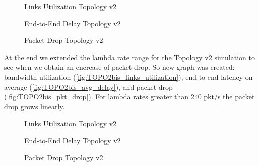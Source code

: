 \documentclass{article}
\begin{document}
\begin{figure}[H]
    \centering
    
    \caption{Links Utilization Topology v2}
    \label{fig:TOPO2_links_utilization}
\end{figure}
\begin{figure}[H]
    \centering
    
    \caption{End-to-End Delay Topology v2}
    \label{fig:TOPO2_avg_delay}
\end{figure}
\begin{figure}[H]
    \centering
    
    \caption{Packet Drop Topology v2}
    \label{fig:TOPO2_pkt_drop}
\end{figure}

\noindent At the end we extended the lambda rate range for the Topology v2 simulation to see when we obtain an encrease of packet drop. So new graph was created: bandwidth utilization (\autoref{fig:TOPO2bis_links_utilization}), end-to-end latency on average (\autoref{fig:TOPO2bis_avg_delay}), and packet drop (\autoref{fig:TOPO2bis_pkt_drop}). For lambda rates greater than 240 pkt/s the packet drop grows linearly.

\begin{figure}[H]
    \centering
    
    \caption{Links Utilization Topology v2}
    \label{fig:TOPO2bis_links_utilization}
\end{figure}
\begin{figure}[H]
    \centering
    
    \caption{End-to-End Delay Topology v2}
    \label{fig:TOPO2bis_avg_delay}
\end{figure}
\begin{figure}[H]
    \centering
    
    \caption{Packet Drop Topology v2}
    \label{fig:TOPO2bis_pkt_drop}
\end{figure}

\newpage
\printbibliography[heading=bibintoc]
\end{document}
